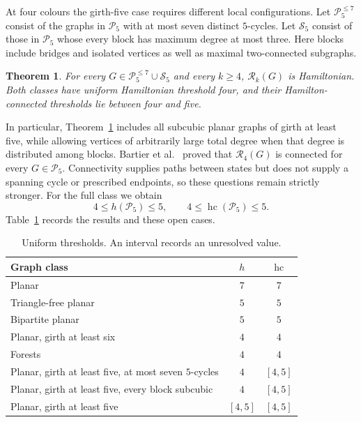 \documentclass[11pt]{article}
\newtheorem{theorem}{Theorem}[section]
\theoremstyle{remark}
\newcommand{\R}{\mathcal R}
\newcommand{\Rk}{\mathcal R_k}
\newcommand{\hc}{\operatorname{hc}}
\numberwithin{equation}{section}
\numberwithin{table}{section}
\begin{document}
At four colours the girth-five case requires different local
configurations. Let $\mathcal P_5^{\le7}$ consist of the graphs in
$\mathcal P_5$ with at most seven distinct $5$-cycles. Let
$\mathcal S_5$ consist of those in $\mathcal P_5$ whose every block
has maximum degree at most three. Here blocks include bridges and
isolated vertices as well as maximal two-connected subgraphs.

\begin{theorem}\label{thm:main-four}
For every $G\in\mathcal P_5^{\le7}\cup\mathcal S_5$ and every $k\ge4$,
$\Rk(G)$ is Hamiltonian. Both classes have uniform Hamiltonian
threshold four, and their Hamilton-connected thresholds lie between
four and five.
\end{theorem}

In particular, Theorem~\ref{thm:main-four} includes all subcubic planar
graphs of girth at least five, while allowing vertices of arbitrarily
large total degree when that degree is distributed among blocks.
Bartier et al.~\cite{BBFHMP23} proved that $\R_4(G)$ is connected for
every $G\in\mathcal P_5$. Connectivity supplies paths between states but
does not supply a spanning cycle or prescribed endpoints, so these questions
remain strictly stronger. For the full class we obtain
\[
4\le h(\mathcal P_5)\le5,\qquad 4\le\hc(\mathcal P_5)\le5.
\]
Table~\ref{tab:thresholds} records the results and these open cases.

\begin{table}[htbp]
\centering\footnotesize
\renewcommand{\arraystretch}{0.9}
\caption{Uniform thresholds. An interval records an unresolved value.}
\label{tab:thresholds}
\begin{tabularx}{\linewidth}{@{}Xcc@{}}
\toprule
Graph class & $h$ & $\hc$\\
\midrule
Planar & $7$ & $7$\\
Triangle-free planar & $5$ & $5$\\
Bipartite planar & $5$ & $5$\\
Planar, girth at least six & $4$ & $4$\\
Forests & $4$ & $4$\\
Planar, girth at least five, at most seven $5$-cycles & $4$ & $[4,5]$\\
Planar, girth at least five, every block subcubic & $4$ & $[4,5]$\\
Planar, girth at least five & $[4,5]$ & $[4,5]$\\
\bottomrule
\end{tabularx}
\end{table}
\end{document}
